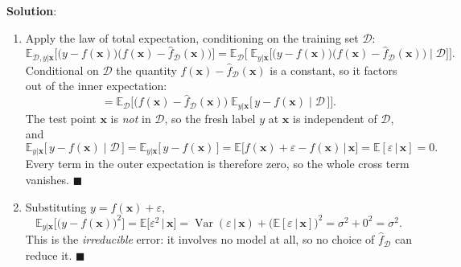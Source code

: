 \documentclass[submit]{../harvardml}
\newenvironment{solution}{
    \vspace{2mm}
    \color{blue}\noindent\textbf{Solution}:
}{}
\begin{document}
\begin{solution}
\begin{enumerate}
\begin{enumerate}
\item
Apply the law of total expectation, conditioning on the training set $\mathcal D$:
\[
  \mathbb E_{\mathcal D, y|\mathbf x}\Big[\big(y-f(\mathbf x)\big)\big(f(\mathbf x)-\hat f_{\mathcal D}(\mathbf x)\big)\Big]
  = \mathbb E_{\mathcal D}\Big[\;\mathbb E_{y|\mathbf x}\Big[\big(y-f(\mathbf x)\big)\big(f(\mathbf x)-\hat f_{\mathcal D}(\mathbf x)\big)\;\Big|\;\mathcal D\Big]\Big].
\]
Conditional on $\mathcal D$ the quantity $f(\mathbf x) - \hat f_{\mathcal D}(\mathbf x)$ is a
constant, so it factors out of the inner expectation:
\[
  = \mathbb E_{\mathcal D}\Big[\big(f(\mathbf x)-\hat f_{\mathcal D}(\mathbf x)\big)\;
      \mathbb E_{y|\mathbf x}\big[\,y - f(\mathbf x) \;\big|\; \mathcal D\,\big]\Big].
\]
The test point $\mathbf x$ is \emph{not} in $\mathcal D$, so the fresh label $y$ at
$\mathbf x$ is independent of $\mathcal D$, and
\[
  \mathbb E_{y|\mathbf x}\big[\,y - f(\mathbf x)\;\big|\;\mathcal D\,\big]
  = \mathbb E_{y|\mathbf x}\big[\,y - f(\mathbf x)\,\big]
  = \mathbb E\big[f(\mathbf x) + \varepsilon - f(\mathbf x)\,\big|\,\mathbf x\big]
  = \mathbb E[\varepsilon \,|\, \mathbf x] = 0 .
\]
Every term in the outer expectation is therefore zero, so the whole cross term
vanishes. $\blacksquare$

\item
Substituting $y = f(\mathbf x) + \varepsilon$,
\[
  \mathbb E_{y|\mathbf x}\Big[\big(y - f(\mathbf x)\big)^2\Big]
  = \mathbb E\big[\varepsilon^2 \,\big|\, \mathbf x\big]
  = \operatorname{Var}(\varepsilon \,|\, \mathbf x) + \big(\mathbb E[\varepsilon\,|\,\mathbf x]\big)^2
  = \sigma^2 + 0^2 = \sigma^2 .
\]
This is the \emph{irreducible} error: it involves no model at all, so no choice of
$\hat f_{\mathcal D}$ can reduce it. $\blacksquare$


\end{enumerate}
\end{enumerate}
\end{solution}
\end{document}
